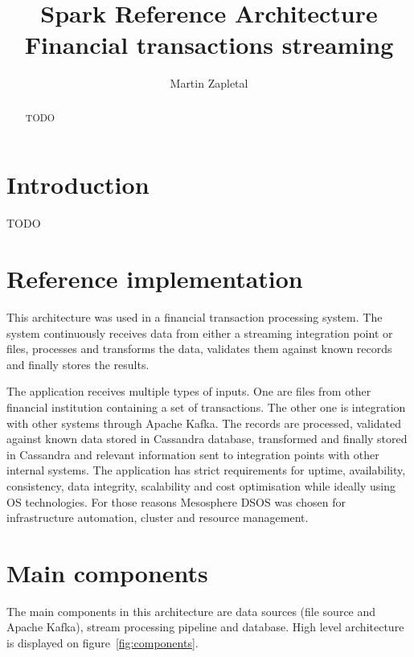 \documentclass[a4paper, 10 pt, conference]{IEEEtran}
\title{Spark Reference Architecture \\ Financial transactions streaming}
\author{Martin Zapletal%
}
\begin{document}
\maketitle
\thispagestyle{empty}
\pagestyle{empty}

\begin{abstract}

TODO

\end{abstract}


\section{Introduction}

TODO

\section{Reference implementation}

This architecture was used in a financial transaction processing system. The system continuously receives data from either a streaming integration point or files, processes and transforms the data, validates them against known records and finally stores the results.

The application receives multiple types of inputs. One are files from other financial institution containing a set of transactions. The other one is integration with other systems through Apache Kafka. The records are processed, validated against known data stored in Cassandra database, transformed and finally stored in Cassandra and relevant information sent to integration points with other internal systems. The application has strict requirements for uptime, availability, consistency, data integrity, scalability and cost optimisation while ideally using OS technologies. For those reasons Mesosphere DSOS was chosen for infrastructure automation, cluster and resource management.

\section{Main components}

The main components in this architecture are data sources (file source and Apache Kafka), stream processing pipeline and database. High level architecture is displayed on figure~\ref{fig:components}. 
\end{document}
